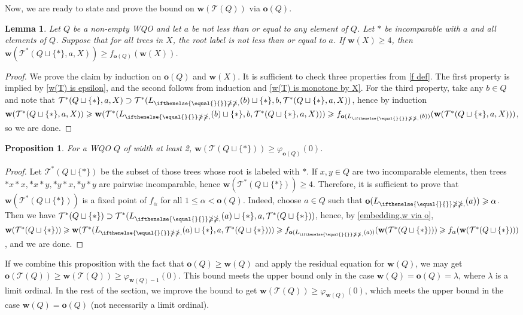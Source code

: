 \documentclass[10pt,a4paper]{amsart}
\let \leq \leqslant
\let \geq \geqslant
\let \ngeq \ngeqslant
\let \phi \varphi
\renewcommand \L [2][]{L_{\ifthenelse{\equal{#1}{}}\ngeq{\ngeq,#1}}(#2)}
\renewcommand \l [2][]{\o(\L[#1]{#2})}
\def \T {\mathcal{T}}
\def \o {\textbf{o}}
\def \w {\textbf{w}}
\newtheorem{lemma}{Lemma}
\newtheorem{proposition}{Proposition}
\begin{document}
Now, we are ready to state and prove the bound on $\w(\T(Q))$ via $\o(Q)$.

\begin{lemma}\label{w via o}
    Let $Q$ be a non-empty WQO and let $a$ be not less than or equal to any element of $Q$.
    Let $*$ be incomparable with $a$ and all elements of $Q$.
    Suppose that for all trees in $X$, the root label is not less than or equal to $a$.
    If $\w(X) \geq 4$, then $\w(\T^*(Q\sqcup\{*\}, a, X)) \geq f_{\o(Q)}(\w(X))$.
\end{lemma}
\begin{proof}
    We prove the claim by induction on $\o(Q)$ and $\w(X)$. It is sufficient to check three properties from \cref{f def}.
    The first property is implied by \cref{w(T) is epsilon}, and the second follows from induction and \cref{w(T) is monotone by X}. For the third property, take any $b \in Q$ and note that $\T^*(Q\sqcup\{*\}, a, X) \supset \T^*(\L{b}\sqcup\{*\}, b, \T^*(Q\sqcup\{*\}, a, X))$, hence by induction $\w(\T^*(Q\sqcup\{*\}, a, X)) \geq \w(\T^*(\L{b}\sqcup\{*\}, b, \T^*(Q\sqcup\{*\}, a, X))) \geq f_{\l{b}}(\w(\T^*(Q\sqcup\{*\}, a, X)))$, so we are done.
\end{proof}

\begin{proposition}\label{w T(Q cup *)}
    For a WQO $Q$ of width at least 2, $\w(\T(Q \sqcup \{*\})) \geq \phi_{\o(Q)}(0)$.
\end{proposition}
\begin{proof}
    Let $\T^*(Q\sqcup\{*\})$ be the subset of those trees whose root is labeled with $*$. If $x,y \in Q$ are two incomparable elements, then trees $*x*x,*x*y,*y*x,*y*y$ are pairwise incomparable, hence $\w(\T^*(Q\sqcup\{*\})) \geq 4$. Therefore, it is sufficient to prove that $\w(\T^*(Q\sqcup\{*\}))$ is a fixed point of $f_\alpha$ for all $1 \leq \alpha < \o(Q)$.
    Indeed, choose $a \in Q$ such that $\l{a} \geq \alpha$. Then we have $\T^*(Q\sqcup\{*\}) \supset \T^*(\L{a}\sqcup\{*\}, a, \T^*(Q\sqcup\{*\}))$, hence, by \cref{embedding,w via o}, $\w(\T^*(Q\sqcup\{*\})) \geq \w(\T^*(\L{a}\sqcup\{*\}, a, \T^*(Q\sqcup\{*\}))) \geq f_{\l{a}}(\w(\T^*(Q\sqcup\{*\}))) \geq f_\alpha(\w(\T^*(Q\sqcup\{*\})))$, and we are done.
\end{proof}

If we combine this proposition with the fact that $\o(Q) \geq \w(Q)$ and apply the residual equation for $\w(Q)$, we may get $\o(\T(Q)) \geq \w(\T(Q)) \geq \phi_{\w(Q)-1}(0)$. This bound meets the upper bound only in the case $\w(Q) = \o(Q) = \lambda$, where $\lambda$ is a limit ordinal. In the rest of the section, we improve the bound to get $\w(\T(Q)) \geq \phi_{\w(Q)}(0)$, which meets the upper bound in the case $\w(Q) = \o(Q)$ (not necessarily a limit ordinal).
\end{document}
